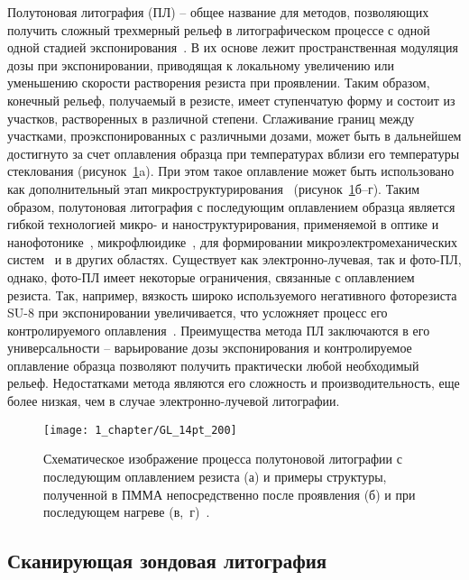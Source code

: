 Полутоновая литография (ПЛ) -- общее название для методов, позволяющих получить сложный трехмерный рельеф в литографическом процессе с одной одной стадией экспонирования~\cite{GL_general}. В их основе лежит пространственная модуляция дозы при экспонировании, приводящая к локальному увеличению или уменьшению скорости растворения резиста при проявлении. Таким образом, конечный рельеф, получаемый в резисте, имеет ступенчатую форму и состоит из участков, растворенных в различной степени. Сглаживание границ между участками, проэкспонированных с различными дозами, может быть в дальнейшем достигнуто за счет оплавления образца при температурах вблизи его температуры стеклования (рисунок~\ref{fig:GL}a). При этом такое оплавление может быть использовано как дополнительный этап микроструктурирования~\cite{Kirchner_reflow} (рисунок~\ref{fig:GL}б--г). Таким образом, полутоновая литография с последующим оплавлением образца является гибкой технологией микро- и наноструктурирования, применяемой в оптике и нанофотонике~\cite{GL_optics}, микрофлюидике~\cite{GL_microfluidics}, для формировании микроэлектромеханических систем~\cite{GL_MEMS} и в других областях. Существует как электронно-лучевая, так и фото-ПЛ, однако, фото-ПЛ имеет некоторые ограничения, связанные с оплавлением резиста. Так, например, вязкость широко используемого негативного фоторезиста SU-8 при экспонировании увеличивается, что усложняет процесс его контролируемого оплавления~\cite{Kirchner_GL_review}. Преимущества метода ПЛ заключаются в его универсальности -- варьирование дозы экспонирования и контролируемое оплавление образца позволяют получить практически любой необходимый рельеф. Недостатками метода являются его сложность и производительность, еще более низкая, чем в случае электронно-лучевой литографии.

\begin{figure}[t]
	\centering
	\texttt{[image: 1\_chapter/GL\_14pt\_200]}
	\vspace{1em}
	\caption{Схематическое изображение процесса полутоновой литографии с последующим оплавлением резиста (а) и примеры структуры, полученной в ПММА непосредственно после проявления (б) и при последующем нагреве (в,~г)~\cite{Kirchner_reflow}.}
	\label{fig:GL}
\end{figure}


\subsection{Сканирующая зондовая литография}

